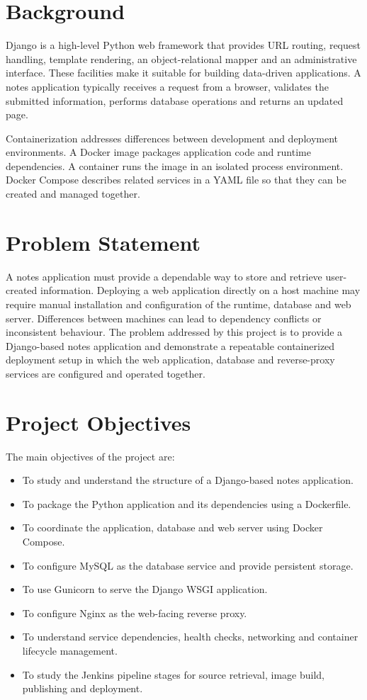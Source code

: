 \documentclass[12pt,a4paper,oneside]{report}
\begin{document}
\section{Background}
Django is a high-level Python web framework that provides URL routing, request handling, template rendering, an object-relational mapper and an administrative interface. These facilities make it suitable for building data-driven applications. A notes application typically receives a request from a browser, validates the submitted information, performs database operations and returns an updated page.

Containerization addresses differences between development and deployment environments. A Docker image packages application code and runtime dependencies. A container runs the image in an isolated process environment. Docker Compose describes related services in a YAML file so that they can be created and managed together.

\section{Problem Statement}
A notes application must provide a dependable way to store and retrieve user-created information. Deploying a web application directly on a host machine may require manual installation and configuration of the runtime, database and web server. Differences between machines can lead to dependency conflicts or inconsistent behaviour. The problem addressed by this project is to provide a Django-based notes application and demonstrate a repeatable containerized deployment setup in which the web application, database and reverse-proxy services are configured and operated together.

\section{Project Objectives}
The main objectives of the project are:
\begin{itemize}[leftmargin=0.4in]
\item To study and understand the structure of a Django-based notes application.
\item To package the Python application and its dependencies using a Dockerfile.
\item To coordinate the application, database and web server using Docker Compose.
\item To configure MySQL as the database service and provide persistent storage.
\item To use Gunicorn to serve the Django WSGI application.
\item To configure Nginx as the web-facing reverse proxy.
\item To understand service dependencies, health checks, networking and container lifecycle management.
\item To study the Jenkins pipeline stages for source retrieval, image build, publishing and deployment.
\end{itemize}
\end{document}
